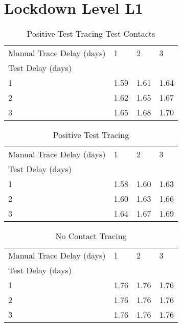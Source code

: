 \documentclass{article}
\begin{document}
    

\section{Lockdown Level L1}


    \begin{table}[H]
         \begin{tabular}{llll}
\toprule
Manual Trace Delay (days) &     1 &     2 &     3 \\
Test Delay (days) &       &       &       \\
\midrule
1                 &  1.59 &  1.61 &  1.64 \\
2                 &  1.62 &  1.65 &  1.67 \\
3                 &  1.65 &  1.68 &  1.70 \\
\bottomrule
\end{tabular}

        \caption{Positive Test Tracing Test Contacts}
    \end{table}
    


    \begin{table}[H]
         \begin{tabular}{llll}
\toprule
Manual Trace Delay (days) &     1 &     2 &     3 \\
Test Delay (days) &       &       &       \\
\midrule
1                 &  1.58 &  1.60 &  1.63 \\
2                 &  1.60 &  1.63 &  1.66 \\
3                 &  1.64 &  1.67 &  1.69 \\
\bottomrule
\end{tabular}

        \caption{Positive Test Tracing}
    \end{table}
    


    \begin{table}[H]
         \begin{tabular}{llll}
\toprule
Manual Trace Delay (days) &     1 &     2 &     3 \\
Test Delay (days) &       &       &       \\
\midrule
1                 &  1.76 &  1.76 &  1.76 \\
2                 &  1.76 &  1.76 &  1.76 \\
3                 &  1.76 &  1.76 &  1.76 \\
\bottomrule
\end{tabular}

        \caption{No Contact Tracing}
    \end{table}
    
\end{document}
